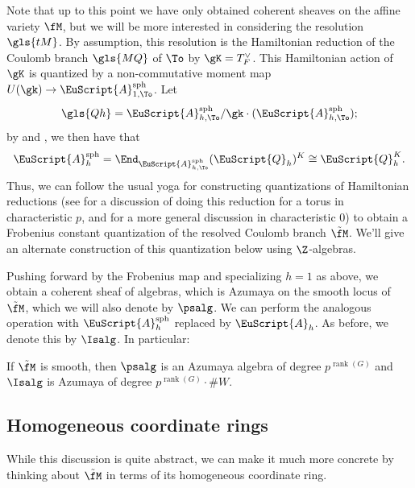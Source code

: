 Note that up to this point we have only obtained coherent sheaves on the affine variety $\fM$, but we will be more interested in considering the resolution $\gls{tM}$.  By assumption, this resolution is the Hamiltonian reduction of the  Coulomb branch $\gls{MQ}$ of $\To$ by $\gK=T_F^\vee$.  This Hamiltonian action of $\gK$ is quantized by a non-commutative moment map $U(\gk)\to \EuScript{A}_{1,\To}^{\operatorname{sph}}$.  Let \[\gls{Qh}=\EuScript{A}_{h,\To}^{\operatorname{sph}}/\gk \cdot (\EuScript{A}_{h,\To}^{\operatorname{sph}});\] by \cite[3(vii)(d)]{BFN} and \cite[Lem. 3.12]{WebSD}, we then have that
\begin{equation}
\EuScript{A}_{h}^{\operatorname{sph}}=\End_{\EuScript{A}_{h,\To}^{\operatorname{sph}} }(\EuScript{Q}_h)^K\cong \EuScript{Q}_h^K.\label{eq:qham}
\end{equation}
Thus, we can follow the usual yoga for constructing quantizations of Hamiltonian reductions (see \cite[4.3]{Stadnik} for a discussion of doing this reduction for a torus in characteristic $p$, and \cite[\S 2.5]{KR07} for a more general discussion in characteristic $0$)  to obtain a Frobenius constant quantization of the
resolved Coulomb branch $\tilde{\fM}$.  We'll give an alternate construction of this quantization below using $\Z$-algebras.

Pushing forward by the
Frobenius map and specializing $h=1$ as above, we obtain a coherent
sheaf of algebras, which is Azumaya on the smooth locus of
$\tilde{\fM}$, which we will also denote by $\psalg$.  We can perform the analogous operation with $\EuScript{A}_h ^{\operatorname{sph}}$ replaced by  $\EuScript{A}_h$.  As before, we denote this by $\Isalg$.
In particular: \begin{lemma}
  If $\tilde{\fM}$ is smooth, then $\psalg$ is an Azumaya algebra of degree $p^{\operatorname{rank}(G)}$ and $\Isalg$ is Azumaya of degree $p^{\operatorname{rank}(G)}\cdot \#W$.  
\end{lemma}



\subsection{Homogeneous coordinate rings}  
While this discussion is quite abstract, we can make it much more concrete by thinking about $\tilde{\fM}$ in terms of its homogeneous coordinate ring.

